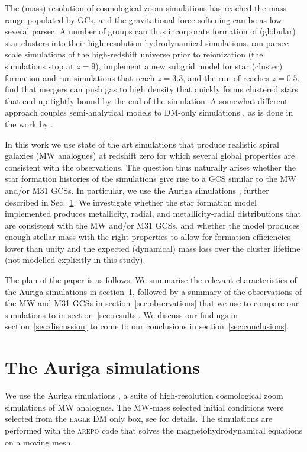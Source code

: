 \documentclass[a4paper,fleqn,usenatbib]{mnras}
\begin{document}
The (mass) resolution of cosmological zoom simulations has reached the mass range 
populated by GCs, and the gravitational force softening can be as low several 
parsec. A number of groups can thus incorporate formation of (globular) star 
clusters into their high-resolution hydrodynamical simulations. \citet{2016ApJ...831..204R} 
ran parsec scale simulations of the high-redshift universe 
prior to reionization (the simulations stop at $z=9$), \citet{2017ApJ...834...69L} 
implement a new subgrid model for star (cluster) formation and run simulations 
that reach $z=3.3$, and the run of \citet{2017MNRAS.465.3622R} reaches $z=0.5$. 
\citet{2018MNRAS.474.4232K} find that mergers can push gas to high density that
quickly forms clustered stars that end up tightly bound by the end of the 
simulation. A somewhat different approach couples semi-analytical models to DM-only
simulations \citep{2010ApJ...718.1266M,2014ApJ...796...10L,2018MNRAS.480.2343C,
2019MNRAS.486..331C,2019arXiv190505199C}, as is done in the work by 
\citet{2019MNRAS.482.4528E}.

In this work we use state of the art simulations that produce realistic spiral 
galaxies (MW analogues) at redshift zero for which several global properties 
are consistent with the observations. The question thus naturally arises whether 
the star formation histories of the simulations give rise to a GCS similar to 
the MW and/or M31 GCSs. In particular, 
we use the Auriga simulations \citep[][hereafter G17]{2017MNRAS.467..179G}, 
further described in Sec.~\ref{sec:auriga}. We investigate whether the star 
formation model implemented produces metallicity, 
radial, and metallicity-radial distributions that are consistent with the MW 
and/or M31 GCSs, and whether the model produces enough stellar mass with
the right properties to allow for formation efficiencies lower than unity and
the expected (dynamical) mass loss over the cluster lifetime (not modelled 
explicitly in this study). 

The plan of the paper is as follows. We summarise the relevant characteristics 
of the Auriga simulations in section~\ref{sec:auriga}, followed by a summary of 
the observations of the MW and M31 GCSs
in section~\ref{sec:observations} that we use to compare our simulations to in
section~\ref{sec:results}. We discuss our findings in section~\ref{sec:discussion}
to come to our conclusions in section~\ref{sec:conclusions}.


\section{The Auriga simulations}
\label{sec:auriga}
We use the Auriga simulations , a suite of 
high-resolution cosmological zoom simulations of MW analogues. The MW-mass
selected initial conditions were selected from the \mbox{\textsc{eagle}} DM only 
box, see  for details. The simulations are 
performed with the \textsc{arepo} code \citep{2010MNRAS.401..791S, 2016MNRAS.455.1134P} 
that solves the magnetohydrodynamical equations on a moving mesh. 
\end{document}
